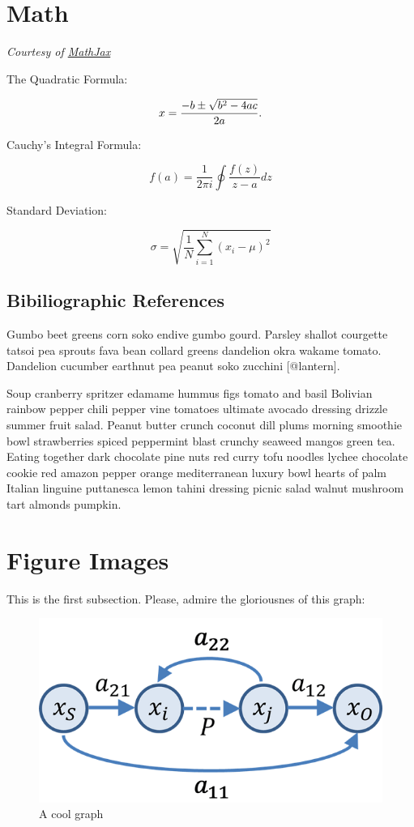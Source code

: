 \documentclass[
  11pt,
,
onecolumn,
openany
]{book}
\begin{document}
\hypertarget{math}{%
\section{Math}\label{math}}

\emph{Courtesy of \href{https://www.mathjax.org/\#samples}{MathJax}}

The Quadratic Formula:

\[x = {-b \pm \sqrt{b^2-4ac} \over 2a}.\]

Cauchy's Integral Formula:

\[f(a) = \frac{1}{2\pi i} \oint\frac{f(z)}{z-a}dz\]

Standard Deviation:

\[\sigma = \sqrt{ \frac{1}{N} \sum_{i=1}^N (x_i -\mu)^2}\]

\hypertarget{bibiliographic-references}{%
\subsection{Bibiliographic References}\label{bibiliographic-references}}

Gumbo beet greens corn soko endive gumbo gourd. Parsley shallot courgette
tatsoi pea sprouts fava bean collard greens dandelion okra wakame tomato.
Dandelion cucumber earthnut pea peanut soko zucchini {[}@lantern{]}.

Soup cranberry spritzer edamame hummus figs tomato and basil Bolivian rainbow
pepper chili pepper vine tomatoes ultimate avocado dressing drizzle summer
fruit salad. Peanut butter crunch coconut dill plums morning smoothie bowl
strawberries spiced peppermint blast crunchy seaweed mangos green tea. Eating
together dark chocolate pine nuts red curry tofu noodles lychee chocolate
cookie red amazon pepper orange mediterranean luxury bowl hearts of palm
Italian linguine puttanesca lemon tahini dressing picnic salad walnut mushroom
tart almonds pumpkin.

\hypertarget{figure-images}{%
\section{Figure Images}\label{figure-images}}

This is the first subsection. Please, admire the gloriousnes of this graph:

\begin{figure}
\hypertarget{fig:graph}{%
\centering
\includegraphics{graph.png}
\caption{A cool graph}\label{fig:graph}
}
\end{figure}
\end{document}
